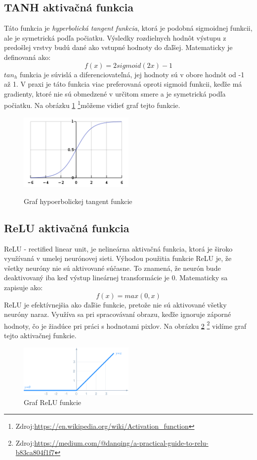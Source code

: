 \subsection{TANH aktivačná funkcia}
Táto funkcia je \emph{hyperbolická tangent funkcia}, ktorá je podobná sigmoidnej funkcii, ale je symetrická podľa počiatku. Výsledky rozdielnych hodnôt výstupu z predošlej vrstvy budú dané ako vstupné hodnoty do ďaľšej. Matematicky je definovaná ako:
$$f(x) = 2sigmoid(2x)-1$$
$tan_h$ funkcia je súvislá a diferenciovateľná, jej hodnoty sú v obore hodnôt od -1 až 1. V praxi je táto funkcia viac preferovaná oproti sigmoid funkcii, keďže  má gradienty, ktoré nie sú obmedzené v určitom smere a je symetrická podľa počiatku.\cite{sharma} Na obrázku \ref{tan} \footnote{Zdroj:\url{https://en.wikipedia.org/wiki/Activation_function}}môžeme vidieť graf tejto funkcie.

\begin{figure}[!ht]
    \caption{Graf hypoerbolickej tangent funkcie}
    \centering
     \includegraphics[width=0.5\textwidth]{obrazky-figures/tahn.png}
    \label{tan}
\end{figure}


\subsection{ReLU aktivačná funkcia}
ReLU - rectified linear unit, je nelineárna aktivačná funkcia, ktorá je široko využívaná v umelej neurónovej sieti. Výhodou použitia funkcie ReLU je, že všetky neuróny nie sú aktivované  súčasne. To znamená, že neurón bude deaktivovaný iba keď výstup lineárnej transformácie je 0. Matematicky sa zapisuje ako:
$$f(x) = max(0,x)$$
ReLU je efektívnejšia ako ďaľšie funkcie, pretože nie sú aktivované všetky neuróny naraz. Využíva sa pri spracovávaní obrazu, keďže ignoruje záporné hodnoty, čo je žiadúce pri práci s hodnotami pixlov.\cite{sharma} Na obrázku \ref{relu} \footnote{Zdroj:\url{https://medium.com/@danqing/a-practical-guide-to-relu-b83ca804f1f7}} vidíme graf tejto aktivačnej funkcie.
 \begin{figure}[!ht]
 \centering
 \includegraphics[width=0.5\textwidth]{obrazky-figures/relu.png}
\caption{Graf ReLU funkcie }

\label{relu}
\end{figure}
